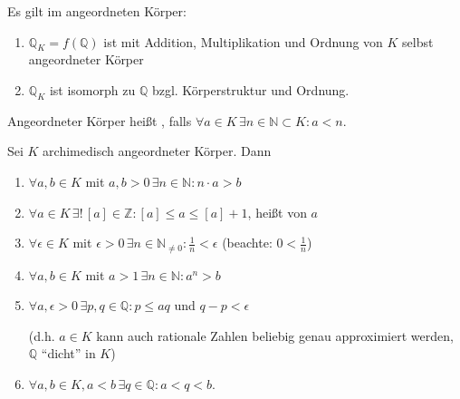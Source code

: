 \begin{conclusion}
	Es gilt im angeordneten Körper:
	\begin{enumerate}[label={\arabic*)}]
		\item $\mathbb{Q}_K = f(\mathbb{Q})$ ist mit Addition, Multiplikation und Ordnung von $K$ selbst angeordneter Körper
		\item $\mathbb{Q}_K$ ist isomorph zu $\mathbb{Q}$ bzgl. Körperstruktur und Ordnung.
	\end{enumerate}
\end{conclusion}

\begin{definition}
	Angeordneter Körper heißt , falls $\forall a\in K\,\exists n\in\mathbb{N}\subset K: a < n$.
\end{definition}
\begin{proposition}
	Sei $K$ archimedisch angeordneter Körper. Dann\begin{enumerate}[label={\arabic*)}]
		\item $\forall a,b\in K$ mit $a,b>0\,\exists n\in\mathbb{N}: n\cdot a > b$
		\item $\forall a\in K\,\exists!\,[a]\in\mathbb{Z}: [a]\le a \le [a] +1$,  heißt  von $a$
		\item $\forall \epsilon \in K$ mit $\epsilon > 0\,\exists n\in\mathbb{N}_{\neq 0}: \frac{1}{n}< \epsilon$ (beachte: $0 < \frac{1}{n}$)
		\item $\forall a,b\in K$ mit $a>1\,\exists n\in\mathbb{N}: a^n > b$
		\item $\forall a,\epsilon > 0\,\exists p,q\in\mathbb{Q}: p \le a  q$ und $q - p < \epsilon$
		
		(d.h. $a\in K$ kann auch rationale Zahlen beliebig genau approximiert werden, $\mathbb{Q}$ "`dicht"' in $K$)
		\item $\forall a,b\in K, a < b\,\exists q\in\mathbb{Q}:a < q < b$.
	\end{enumerate}
\end{proposition}

